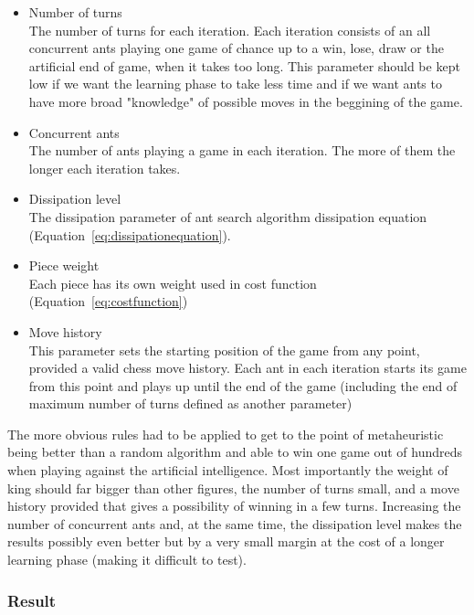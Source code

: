 \documentclass[pdftex]{article}
\begin{document}
\begin{itemize}
 	\item Number of turns \hfill \\
The number of turns for each iteration. Each iteration consists of an all concurrent ants playing one game of chance up to a win, lose, draw or the artificial end of game, when it takes too long. This parameter should be kept low if we want the learning phase to take less time and if we want ants to have more broad "knowledge" of possible moves in the beggining of the game. 
	\item Concurrent ants \hfill \\
The number of ants playing a game in each iteration. The more of them the longer each iteration takes.
 	\item Dissipation level \hfill \\
The dissipation parameter of ant search algorithm dissipation equation (Equation~\ref{eq:dissipationequation}).
	\item Piece weight \hfill \\
Each piece has its own weight used in cost function (Equation~\ref{eq:costfunction})
	\item Move history \hfill \\
This parameter sets the starting position of the game from any point, provided a valid chess move history. Each ant in each iteration starts its game from this point and plays up until the end of the game (including the end of maximum number of turns defined as another parameter)
\end{itemize}

The more obvious rules had to be applied to get to the point of metaheuristic being better than a random algorithm and able to win one game out of hundreds when playing against the artificial intelligence. Most importantly the weight of king should far bigger than other figures, the number of turns small, and a move history provided that gives a possibility of winning in a few turns. Increasing the number of concurrent ants and, at the same time, the dissipation level makes the results possibly even better but by a very small margin at the cost of a longer learning phase (making it difficult to test).


\subsubsection{Result}
\end{document}
